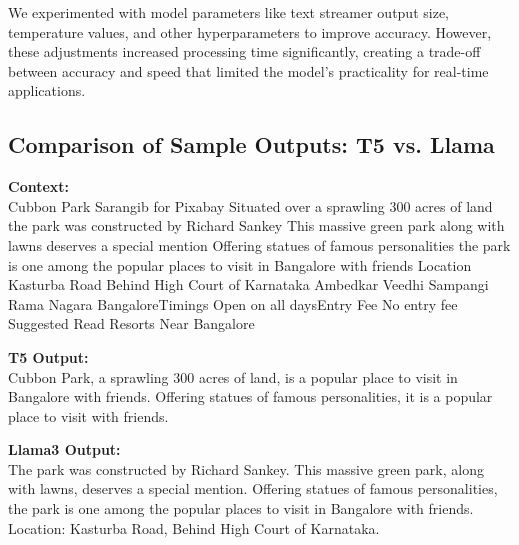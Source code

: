 \documentclass[conference]{IEEEtran}
\begin{document}
    We experimented with model parameters like text streamer output size, temperature values, and other hyperparameters to improve accuracy. However, these adjustments increased processing time significantly, creating a trade-off between accuracy and speed that limited the model's practicality for real-time applications.


    \subsection{Comparison of Sample Outputs: T5 vs. Llama}

        \begin{tcolorbox}[linewidth=1pt, innerleftmargin=15pt, innerrightmargin=15pt, innertopmargin=15pt, innerbottommargin=15pt]
            \textbf{Context:} \\

            Cubbon Park Sarangib for Pixabay Situated over a sprawling 300 acres of land the park was constructed by Richard Sankey This massive green park along with lawns deserves a special mention Offering statues of famous personalities the park is one among the popular places to visit in Bangalore with friends Location Kasturba Road Behind High Court of Karnataka Ambedkar Veedhi Sampangi Rama Nagara BangaloreTimings Open on all daysEntry Fee No entry fee Suggested Read Resorts Near Bangalore
        \end{tcolorbox}


        \begin{tcolorbox}[linewidth=1pt, innerleftmargin=15pt, innerrightmargin=15pt, innertopmargin=15pt, innerbottommargin=15pt]
            \textbf{T5 Output:} \\

            Cubbon Park, a sprawling 300 acres of land, is a popular place to visit in Bangalore with friends. Offering statues of famous personalities, it is a popular place to visit with friends.
        \end{tcolorbox}

        \begin{tcolorbox}[linewidth=1pt, innerleftmargin=15pt, innerrightmargin=15pt, innertopmargin=15pt, innerbottommargin=15pt]
            \textbf{Llama3 Output:} \\

            The park was constructed by Richard Sankey. This massive green park, along with lawns, deserves a special mention. Offering statues of famous personalities, the park is one among the popular places to visit in Bangalore with friends. Location: Kasturba Road, Behind High Court of Karnataka.
        \end{tcolorbox}
\end{document}
